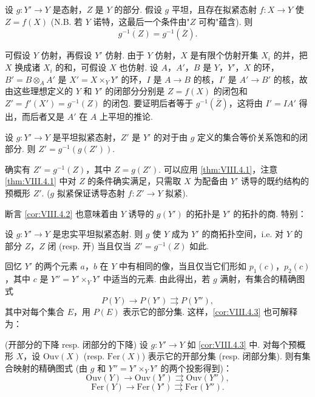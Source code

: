 \begin{theorem}\label{thm:VIII.4.1}
设 $g \colon Y' \to Y$ 是态射，$Z$ 是 $Y$ 的部分. 假设 $g$ 平坦，且存在拟紧态射 $f \colon X \to Y$ 使 $Z = f(X)$ (N.B. 若 $Y$ 诺特，这最后一个条件由"$Z$ 可构"蕴含). 则
\[
\overline{g^{-1}(Z)} = g^{-1}(\overline{Z}).
\]
\end{theorem}

可假设 $Y$ 仿射，再假设 $Y'$ 仿射. 由于 $Y$ 仿射，$X$ 是有限个仿射开集 $X_i$ 的并，把 $X$ 换成诸 $X_i$ 的和，可假设 $X$ 也仿射. 设 $A$，$A'$，$B$ 是 $Y$，$Y'$，$X$ 的环，$B' = B \otimes_A A'$ 是 $X' = X \times_Y Y'$ 的环，$I$ 是 $A \to B$ 的核，$I'$ 是 $A' \to B'$ 的核，故由这些理想定义的 $Y$ 和 $Y'$ 的闭部分分别是 $Z = f(X)$ 的闭包和 $Z' = f'(X') = g^{-1}(Z)$ 的闭包. 要证明后者等于 $g^{-1}(\overline{Z})$，这将由 $I' = IA'$ 得出，而后者又是 $A'$ 在 $A$ 上平坦的推论.

\begin{corollary}\label{cor:VIII.4.2}
设 $g \colon Y' \to Y$ 是平坦拟紧态射，$Z'$ 是 $Y'$ 的对于由 $g$ 定义的集合等价关系饱和的闭部分. 则 $Z' = g^{-1}(g(Z'))$.
\end{corollary}

确实有 $Z' = g^{-1}(Z)$，其中 $Z = g(Z')$. 可以应用 \ref{thm:VIII.4.1}，注意 \ref{thm:VIII.4.1} 中对 $Z$ 的条件确实满足，只需取 $X$ 为配备由 $Y'$ 诱导的既约结构的预概形 $Z'$. ($g$ 拟紧保证诱导态射 $f \colon Z' \to Y$ 拟紧).

断言 \ref{cor:VIII.4.2} 也意味着由 $Y$ 诱导的 $g(Y')$ 的拓扑是 $Y'$ 的拓扑的商. 特别：

\begin{corollary}\label{cor:VIII.4.3}
设 $g \colon Y' \to Y$ 是忠实平坦拟紧态射. 则 $g$ 使 $Y$ 成为 $Y'$ 的商拓扑空间，i.e. 对 $Y$ 的部分 $Z$，$Z$ 闭 (resp. 开) 当且仅当 $Z' = g^{-1}(Z)$ 如此.
\end{corollary}

回忆 $Y'$ 的两个元素 $a$，$b$ 在 $Y$ 中有相同的像，当且仅当它们形如 $p_1(c)$，$p_2(c)$，其中 $c$ 是 $Y'' = Y' \times_Y Y'$ 中适当的元素. 由此得出，若 $g$ 满射，有集合的精确图式
\[
P(Y) \longrightarrow P(Y') \rightrightarrows P(Y''),
\]
其中对每个集合 $E$，用 $P(E)$ 表示它的部分集. 这样，\ref{cor:VIII.4.3} 也可解释为：

\begin{corollary}\label{cor:VIII.4.4}
(开部分的下降 resp. 闭部分的下降) 设 $g \colon Y' \to Y$ 如 \ref{cor:VIII.4.3} 中. 对每个预概形 $X$，设 $\mathrm{Ouv}(X)$ (resp. $\mathrm{Fer}(X)$) 表示它的开部分集 (resp. 闭部分集). 则有集合映射的精确图式 (由 $g$ 和 $Y'' = Y' \times_Y Y'$ 的两个投影得到)：
\[
\mathrm{Ouv}(Y) \longrightarrow \mathrm{Ouv}(Y') \rightrightarrows \mathrm{Ouv}(Y''),
\]
\[
\mathrm{Fer}(Y) \longrightarrow \mathrm{Fer}(Y') \rightrightarrows \mathrm{Fer}(Y'').
\]
\end{corollary}

